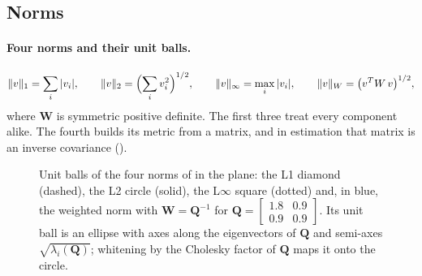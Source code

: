\documentclass[main.tex]{subfiles}
\begin{document}
\subsection{Norms}\label{sec:la-norms}

\paragraph{Four norms and their unit balls.}
\begin{equation}
\lVert v\rVert_1 = \sum_i |v_i|,
\qquad
\lVert v\rVert_2 = \Bigl(\sum_i v_i^2\Bigr)^{1/2},
\qquad
\lVert v\rVert_\infty = \max_i |v_i|,
\qquad
\lVert v\rVert_{W} = \bigl(v^{T}W\,v\bigr)^{1/2},
\label{eq:la-norms}
\end{equation}
where $\bm{W}$ is symmetric positive definite.  The first three treat every
component alike.  The fourth builds its metric from a matrix, and in
estimation that matrix is an inverse covariance ().

\begin{figure}[htbp]
\centering
{}
\caption{Unit balls of the four norms of  in the plane:
the L1 diamond (dashed), the L2 circle (solid), the L$\infty$ square
(dotted) and, in blue, the weighted norm with $\bm{W} = \bm{Q}^{-1}$ for
$\bm{Q} = \left[\begin{smallmatrix} 1.8 & 0.9 \\ 0.9 & 0.9
\end{smallmatrix}\right]$.  Its unit ball is an ellipse with axes along the
eigenvectors of $\bm{Q}$ and semi-axes $\sqrt{\lambda_i(\bm{Q})}$; whitening
by the Cholesky factor of $\bm{Q}$ maps it onto the circle.}
\label{fig:la-balls}
\end{figure}
\end{document}
